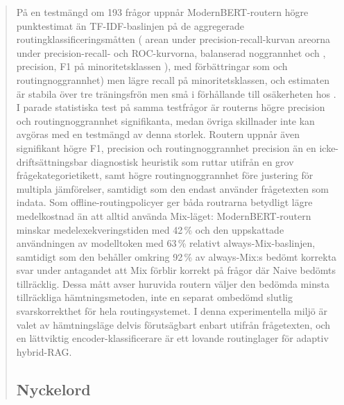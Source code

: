 \documentclass[english, bibtex]{kththesis}               %
\newcommand*{\sweExpl}[1]{\todo[inline, backgroundcolor=kth-lightblue40]{#1}}  %
\renewcommand\sweExpl[1]{}
\numberwithin{listing}{chapter}
\providecommand{\DIFaddtex}[1]{{\protect\color{blue} \sf #1}} %
\providecommand{\DIFdeltex}[1]{{\protect\color{red} \scriptsize #1}} %
\providecommand{\DIFaddbegin}{} %
\providecommand{\DIFaddend}{} %
\providecommand{\DIFdelbegin}{} %
\providecommand{\DIFdelend}{} %
\providecommand{\DIFadd}[1]{\texorpdfstring{\DIFaddtex{#1}}{#1}} %
\providecommand{\DIFdel}[1]{\texorpdfstring{\DIFdeltex{#1}}{}} %
\begin{document}
\begin{abstract}
\begin{scontents}[store-env=abstracts,print-env=true]
På en testmängd om 193 frågor uppnår ModernBERT-routern högre punktestimat än TF-IDF-baslinjen på de aggregerade routingklassificeringsmåtten (\DIFdelbegin \DIFdel{arean under precision-recall-kurvan}\DIFdelend \DIFaddbegin \DIFadd{areorna under precision-recall- och ROC-kurvorna}\DIFaddend , balanserad noggrannhet\DIFdelbegin \DIFdel{och }\DIFdelend \DIFaddbegin \DIFadd{, precision, }\DIFaddend F1 på minoritetsklassen \DIFdelbegin \DIFdel{), med förbättringar som }\DIFdelend \DIFaddbegin \DIFadd{och routingnoggrannhet) men lägre recall på minoritetsklassen, och estimaten }\DIFaddend är stabila över tre träningsfrön\DIFdelbegin \DIFdel{men små i förhållande till osäkerheten hos }\DIFdelend \DIFaddbegin \DIFadd{. I parade statistiska test på samma testfrågor är routerns högre precision och routingnoggrannhet signifikanta, medan övriga skillnader inte kan avgöras med }\DIFaddend en testmängd av denna storlek. Routern uppnår även \DIFaddbegin \DIFadd{signifikant }\DIFaddend högre \DIFdelbegin \DIFdel{F1, precision och routingnoggrannhet }\DIFdelend \DIFaddbegin \DIFadd{precision }\DIFaddend än en icke-driftsättningsbar diagnostisk heuristik som ruttar utifrån en grov frågekategorietikett, \DIFaddbegin \DIFadd{samt högre routingnoggrannhet före justering för multipla jämförelser, }\DIFaddend samtidigt som den endast använder frågetexten som indata. Som offline-routingpolicyer ger båda routrarna betydligt lägre medelkostnad än att alltid använda Mix-läget: ModernBERT-routern minskar medelexekveringstiden med 42\,\% och den uppskattade användningen av modelltoken med 63\,\% relativt always-Mix-baslinjen, samtidigt som den behåller omkring 92\,\% av always-Mix:s bedömt korrekta svar under antagandet att Mix förblir korrekt på frågor där Naive bedömts tillräcklig. Dessa mått avser huruvida routern väljer den bedömda minsta tillräckliga hämtningsmetoden, inte en separat ombedömd slutlig svarskorrekthet för hela routingsystemet. I denna experimentella miljö är valet av hämtningsläge delvis förutsägbart enbart utifrån frågetexten, och en lättviktig encoder-klassificerare är ett lovande routinglager för adaptiv hybrid-RAG.
\end{scontents}
\subsection*{Nyckelord}
\begin{scontents}[store-env=keywords,print-env=true]
\end{scontents}
\sweExpl{Nyckelord som beskriver innehållet i uppsatsen eller rapporten}
\end{abstract}
\cleardoublepage
{}
\end{document}
